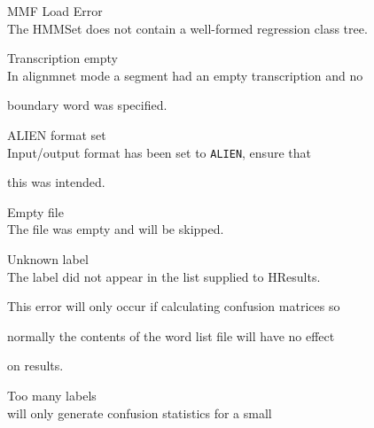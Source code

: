 \begin{itemize}
\begin{itemize}
 MMF Load Error\\


        The HMMSet does not contain a well-formed regression class tree.





 Transcription empty\\


        In alignmnet mode a segment had an empty transcription and no


        boundary word was specified.





    ALIEN format set\\


        Input/output format has been set to \texttt{ALIEN}, ensure that 


        this was intended.





\end{itemize}










\begin{itemize}


    Empty file\\


        The file was empty and will be skipped.





    Unknown label\\


        The label did not appear in the list supplied to HResults.


        This error will only occur if calculating confusion matrices so 


        normally the contents of the word list file will have no effect 


        on results.





    Too many labels\\


         will only generate confusion statistics for a small 



\end{itemize}
\end{itemize}
